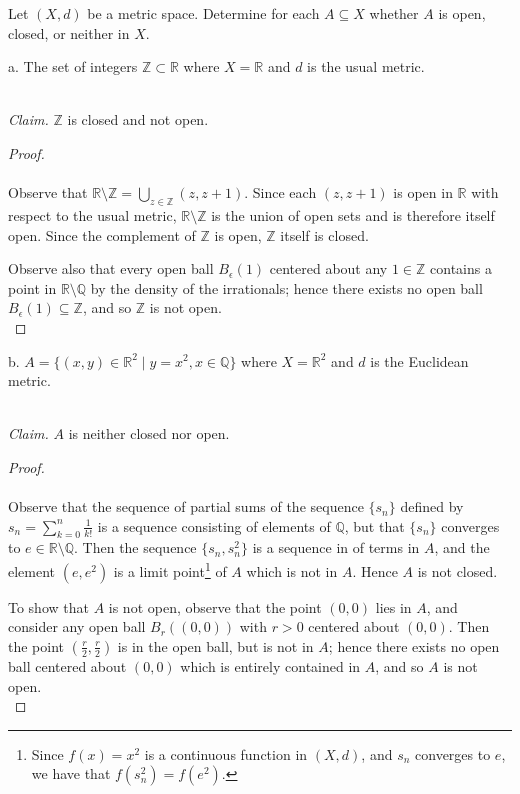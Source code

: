 Let $(X, d)$ be a metric space. Determine for each $A \subseteq X$ whether $A$ is open, closed, or neither in $X$.

a.  The set of integers $\mathbb{Z} \subset \mathbb{R}$ where $X = \mathbb{R}$ and $d$ is the usual metric.

\ \\
\emph{Claim.} $\mathbb{Z}$ is closed and not open.

\begin{proof}\renewcommand{\qedsymbol}{}\ \\\\
    Observe that $\mathbb{R} \setminus \mathbb{Z} = \bigcup\limits_{z \in \mathbb{Z}}{(z, z + 1)}$. Since each 
    $(z, z + 1)$ is open in $\mathbb{R}$ with respect to the usual metric, $\mathbb{R} \setminus \mathbb{Z}$ is the
    union of open sets and is therefore itself open. Since the complement of $\mathbb{Z}$ is open, $\mathbb{Z}$ itself
    is closed.

    Observe also that every open ball $B_\epsilon(1)$ centered about any $1 \in \mathbb{Z}$ contains a point in 
    $\mathbb{R} \setminus \mathbb{Q}$ by the density of the irrationals; hence there exists no open ball 
    $B_\epsilon(1) \subseteq \mathbb{Z}$, and so $\mathbb{Z}$ is not open.
    \ \\
\end{proof}

\pagebreak

b.  $A = \{(x, y) \in \mathbb{R}^2 \mid y=x^2, x \in \mathbb{Q} \}$ where $X = \mathbb{R}^2$ and $d$ is the Euclidean
     metric.

\ \\
\emph{Claim.} $A$ is neither closed nor open.

\begin{proof}\ \\\\
    Observe that the sequence of partial sums of the sequence $\{s_n\}$ defined by 
    $s_n = \sum\limits_{k = 0}^{n}{\frac{1}{k!}}$ is a sequence consisting of elements of $\mathbb{Q}$, but that
    $\{s_n\}$ converges to $e \in \mathbb{R} \setminus \mathbb{Q}$. Then the sequence $\{s_n, s_n^2\}$ is a sequence in
    of terms in $A$, and the element $(e, e^2)$ is a limit point\footnote{
        Since $f(x) = x^2$ is a continuous function in $(X, d)$, and $s_n$ converges to $e$, we have that 
        $f(s_n^2) = f(e^2)$.
    } of $A$ which is not in $A$. Hence $A$ is not closed.

    To show that $A$ is not open, observe that the point $(0, 0)$ lies in $A$, and consider any open ball $B_r((0, 0))$ 
    with $r > 0$ centered about $(0, 0)$. Then the point $(\frac{r}{2}, \frac{r}{2})$ is in the open ball, but is not in
    $A$; hence there exists no open ball centered about $(0, 0)$ which is entirely contained in $A$, and so $A$ is 
    not open.
    \ \\
\end{proof}

